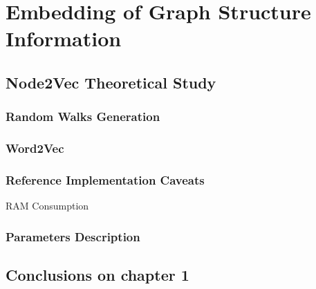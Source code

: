 \chapter{Embedding of Graph Structure Information}\label{chap:1}

\section{Node2Vec Theoretical Study}

\subsection{Random Walks Generation}
\subsection{Word2Vec}
\subsection{Reference Implementation Caveats}
RAM Consumption

\subsection{Parameters Description}







\section{Conclusions on chapter 1}
